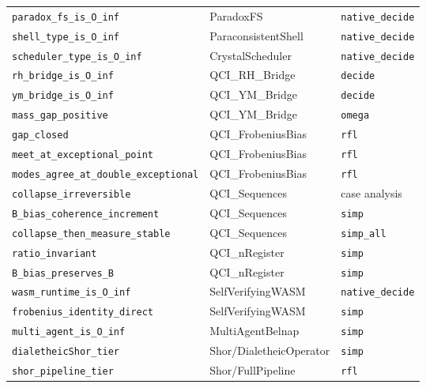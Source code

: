 \documentclass[10pt,a4paper]{article}
\begin{document}
\begin{table}[htbp]
\begin{tabularx}{\textwidth}{>{\centering\arraybackslash}X >{\centering\arraybackslash}X >{\centering\arraybackslash}X}
\texttt{paradox\_\allowbreak fs\_\allowbreak is\_\allowbreak O\_\allowbreak inf} & ParadoxFS & \texttt{native\_\allowbreak decide} \\
\texttt{shell\_\allowbreak type\_\allowbreak is\_\allowbreak O\_\allowbreak inf} & ParaconsistentShell & \texttt{native\_\allowbreak decide} \\
\texttt{scheduler\_\allowbreak type\_\allowbreak is\_\allowbreak O\_\allowbreak inf} & CrystalScheduler & \texttt{native\_\allowbreak decide} \\
\texttt{rh\_\allowbreak bridge\_\allowbreak is\_\allowbreak O\_\allowbreak inf} & QCI\_RH\_Bridge & \texttt{decide} \\
\texttt{ym\_\allowbreak bridge\_\allowbreak is\_\allowbreak O\_\allowbreak inf} & QCI\_YM\_Bridge & \texttt{decide} \\
\texttt{mass\_\allowbreak gap\_\allowbreak positive} & QCI\_YM\_Bridge & \texttt{omega} \\
\texttt{gap\_\allowbreak closed} & QCI\_FrobeniusBias & \texttt{rfl} \\
\texttt{meet\_\allowbreak at\_\allowbreak exceptional\_\allowbreak point} & QCI\_FrobeniusBias & \texttt{rfl} \\
\texttt{modes\_\allowbreak agree\_\allowbreak at\_\allowbreak double\_\allowbreak exceptional} & QCI\_FrobeniusBias & \texttt{rfl} \\
\texttt{collapse\_\allowbreak irreversible} & QCI\_Sequences & case analysis \\
\texttt{B\_\allowbreak bias\_\allowbreak coherence\_\allowbreak increment} & QCI\_Sequences & \texttt{simp} \\
\texttt{collapse\_\allowbreak then\_\allowbreak measure\_\allowbreak stable} & QCI\_Sequences & \texttt{simp\_\allowbreak all} \\
\texttt{ratio\_\allowbreak invariant} & QCI\_nRegister & \texttt{simp} \\
\texttt{B\_\allowbreak bias\_\allowbreak preserves\_\allowbreak B} & QCI\_nRegister & \texttt{simp} \\
\texttt{wasm\_\allowbreak runtime\_\allowbreak is\_\allowbreak O\_\allowbreak inf} & SelfVerifyingWASM & \texttt{native\_\allowbreak decide} \\
\texttt{frobenius\_\allowbreak identity\_\allowbreak direct} & SelfVerifyingWASM & \texttt{simp} \\
\texttt{multi\_\allowbreak agent\_\allowbreak is\_\allowbreak O\_\allowbreak inf} & MultiAgentBelnap & \texttt{simp} \\
\texttt{dialetheicShor\_\allowbreak tier} & Shor/DialetheicOperator & \texttt{simp} \\
\texttt{shor\_\allowbreak pipeline\_\allowbreak tier} & Shor/FullPipeline & \texttt{rfl} \\
\bottomrule
\end{tabularx}
\end{table}
\end{document}
